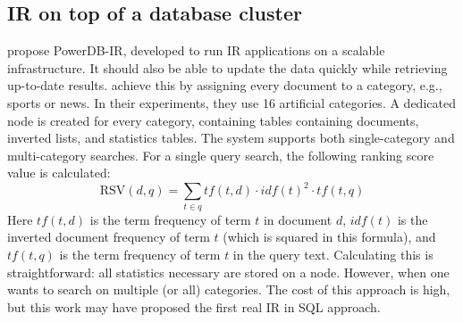 \subsection{IR on top of a database cluster}
 propose PowerDB-IR, developed to run IR applications on a scalable infrastructure. It should also be able to update the data quickly while retrieving up-to-date results.  achieve this by assigning every document to a category, e.g., sports or news. In their experiments, they use 16 artificial categories. A dedicated node is created for every category, containing tables containing documents, inverted lists, and statistics tables. 
The system supports both single-category and multi-category searches. For a single query search, the following ranking score value is calculated:
\begin{equation}
	\text{RSV}(d,q) = \sum_{t\in q} \mathit{tf}(t, d) \cdot \mathit{idf}(t)^2 \cdot \mathit{tf}(t, q)
\end{equation}
Here $\mathit{tf}(t, d)$ is the term frequency of term $t$ in document $d$, $\mathit{idf}(t)$ is the inverted document frequency of term $t$ (which is squared in this formula), and $\mathit{tf}(t, q)$ is the term frequency of term $t$ in the query text. Calculating this is straightforward: all statistics necessary are stored on a node. However, when one wants to search on multiple (or all) categories.
The cost of this approach is high, but this work may have proposed the first real IR in SQL approach. 

